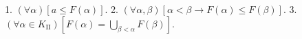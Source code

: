 1. $(\forall \alpha)[a \leq F(\alpha)]$.
2. $(\forall \alpha, \beta)[\alpha < \beta \rightarrow F(\alpha) \leq F(\beta)]$.
3. $(\forall \alpha \in K_{\mathrm{II}})\left[ F(\alpha) = \bigcup_{\beta < \alpha} F(\beta) \right]$.
